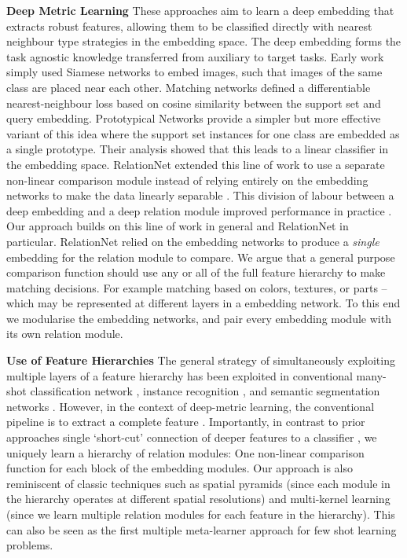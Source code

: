 \documentclass[conference]{IEEEtran}
\newcommand{\keypoint}[1]{\vspace{0.05cm}\noindent\textbf{#1}\quad}
\begin{document}
\keypoint{Deep Metric Learning}
These approaches aim to learn a deep embedding that extracts robust features, allowing them to be classified directly with nearest neighbour type strategies in the embedding space. The deep embedding forms the task agnostic knowledge transferred from auxiliary to target tasks. Early work simply used Siamese networks \cite{koch2015siamese} to embed images, such that images of the same class are placed near each other. Matching networks \cite{vinyals2016matching} defined a differentiable nearest-neighbour loss based on cosine similarity between the support set and query embedding.  
Prototypical Networks \cite{snell2017prototypical} provide a simpler but more effective variant of this idea where the support set instances for one class are embedded as a single prototype. Their analysis showed that this leads to a linear classifier in the embedding space. RelationNet \cite{yang2018learning} extended this line of work to use a separate non-linear comparison module instead of relying entirely on the embedding networks to make the data linearly separable  \cite{koch2015siamese,snell2017prototypical,vinyals2016matching}. This division of labour between a deep embedding and a deep relation module improved performance in practice \cite{yang2018learning}. Our approach builds on this line of work in general and RelationNet in particular. RelationNet relied on the embedding networks to produce a \emph{single} embedding for the relation module to compare. We argue that a general purpose comparison function should use any or all of the full feature hierarchy \cite{zeiler2014understandingCNN} to make matching decisions. For example matching based on colors, textures, or parts -- which may be represented at different layers in a embedding network. To this end we modularise the embedding networks, and pair every embedding module with its own relation module.

\keypoint{Use of Feature Hierarchies}
The general strategy of simultaneously exploiting multiple layers of a feature hierarchy has been exploited in conventional many-shot classification network \cite{huang2017densely,srivastava2015highwayNet}, instance recognition \cite{chang2018mlfn}, and semantic segmentation networks \cite{hariharan2015hypercolumn}. However, in the context of deep-metric learning, the conventional pipeline is to extract a complete feature \cite{ge2018deepMetric,hu2014deepMetric}. Importantly, in contrast to prior approaches single `short-cut' connection of deeper features to a classifier \cite{hariharan2015hypercolumn,chang2018mlfn}, we uniquely learn a hierarchy of relation modules: One non-linear comparison function for each block of the embedding modules. Our approach is also reminiscent of classic techniques such as spatial pyramids \cite{lazebnik2006pyramid} (since each module in the hierarchy operates at different spatial resolutions) and multi-kernel learning \cite{vedaldi2009mklObjDet} (since we learn multiple relation modules for each feature in the hierarchy). This can also be seen as the first multiple meta-learner approach for few shot learning problems.
\end{document}
